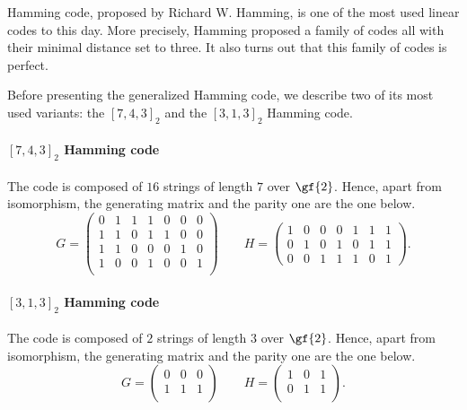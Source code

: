 \documentclass{subfiles}
\begin{document}
    Hamming code, proposed by Richard W. Hamming, is one of the most used linear codes
        to this day. More precisely, Hamming proposed a family of codes all with their
        minimal distance set to three. It also turns out that this family of codes is 
        perfect.

    Before presenting the generalized Hamming code, we describe two of its most 
        used variants: the \([7, 4, 3]_{2}\) and the \([3, 1, 3]_{2}\) Hamming code.
    
    \paragraph*{\([7, 4, 3]_{2}\) Hamming code}
    The code is composed of \(16\) strings of length \(7\) over \(\gf{2}\).
        Hence, apart from isomorphism, the generating matrix and the parity one are the one below.
        \[
            G = \begin{pmatrix}
                0 & 1 & 1 & 1 & 0 & 0 & 0 \\ 
                1 & 1 & 0 & 1 & 1 & 0 & 0 \\ 
                1 & 1 & 0 & 0 & 0 & 1 & 0 \\ 
                1 & 0 & 0 & 1 & 0 & 0 & 1 \\ 
            \end{pmatrix}
            \qquad 
            H = \begin{pmatrix}
                1 & 0 & 0 & 0 & 1 & 1 & 1 \\ 
                0 & 1 & 0 & 1 & 0 & 1 & 1 \\ 
                0 & 0 & 1 & 1 & 1 & 0 & 1
            \end{pmatrix}.
        \]

    \paragraph*{\([3, 1, 3]_{2}\) Hamming code}
    The code is composed of \(2\) strings of length \(3\) over \(\gf{2}\).
        Hence, apart from isomorphism, the generating matrix and the parity one are the one below.
        \[
            G = \begin{pmatrix}
                0 & 0 & 0 \\ 
                1 & 1 & 1 \\
            \end{pmatrix}
            \qquad 
            H = \begin{pmatrix}
                1 & 0 & 1 \\ 
                0 & 1 & 1 \\
            \end{pmatrix}.
        \]
\end{document}
